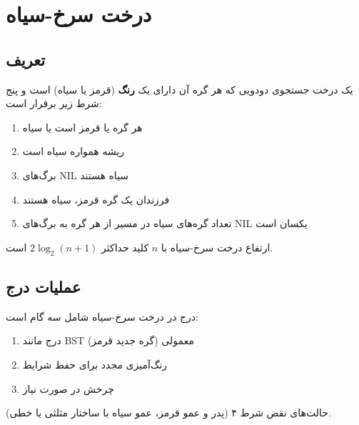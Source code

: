 \documentclass{matinbook}
\begin{document}
    \label{code:avl}
    
    \section{درخت سرخ-سیاه}
    
    \subsection{تعریف}
    
    \begin{definition}
        یک درخت جستجوی دودویی که هر گره آن
        دارای یک \textbf{رنگ}
        (قرمز یا سیاه) است و پنج شرط زیر برقرار است:
        \begin{enumerate}
            \item هر گره یا قرمز است یا سیاه
            \item ریشه همواره سیاه است
            \item برگ‌های NIL سیاه هستند
            \item فرزندان یک گره قرمز، سیاه هستند
            \item تعداد گره‌های سیاه در مسیر از هر گره
            به برگ‌های NIL یکسان است
        \end{enumerate}
        \label{def:red-black}
    \end{definition}
    
    \begin{theorem}
        ارتفاع درخت سرخ-سیاه با $n$ کلید
        حداکثر $2\log_{2}(n+1)$ است.
        \label{thm:rb-height}
    \end{theorem}
    
    \subsection{عملیات درج}
    
    درج در درخت سرخ-سیاه شامل سه گام است:
    \begin{enumerate}
        \item درج مانند BST معمولی (گره جدید قرمز)
        \item رنگ‌آمیزی مجدد برای حفظ شرایط
        \item چرخش در صورت نیاز
    \end{enumerate}
    
    حالت‌های نقض شرط ۴ (پدر و عمو قرمز،
    عمو سیاه با ساختار مثلثی یا خطی).
    
\end{document}
